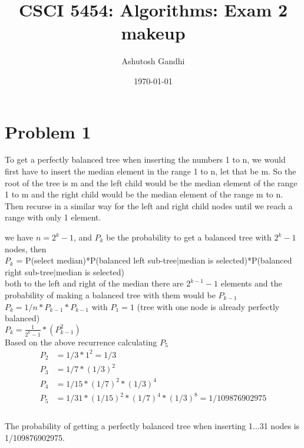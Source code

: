 \documentclass[12pt]{article}
\title{CSCI 5454: Algorithms: Exam 2 makeup}
\author{Ashutosh Gandhi}
\date{\today}
\begin{document}
\maketitle

\section*{Problem 1}


\vspace{10pt}



To get a perfectly balanced tree when inserting the numbers 1 to n, we would first have to insert the median element in the range 1 to n, let that be m. So the root of the tree is m and the left child would be the median element of the range 1 to m and the right child would be the median element of the range m to n. Then recurse in a similar way for the left and right child nodes until we reach a range with only 1 element. 

we have \(n=2^k-1\), and \(P_k\) be the probability to get a balanced tree with \(2^k-1\) nodes, then \\
\(P_k\) = P(select median)*P(balanced left sub-tree\(|\)median is selected)*P(balanced right sub-tree\(|\)median is selected) \\
both to the left and right of the median there are \(2^{k-1}-1\) elements and the probability of making a balanced tree with them would be \(P_{k-1}\) \\
\(P_k = 1/n*P_{k-1}*P_{k-1}\) with \(P_1=1\) (tree with one node is already perfectly balanced) \\
\(P_k=\frac{1}{2^k-1}*(P_{k-1}^2)\) \\
Based on the above recurrence calculating \(P_5\)
\begin{equation}
\begin{aligned}
\nonumber
P_2 &= 1/3*1^2 = 1/3 \\
P_3 &= 1/7*(1/3)^2 \\
P_4 &= 1/15*(1/7)^2*(1/3)^4 \\
P_5 &= 1/31*(1/15)^2*(1/7)^4*(1/3)^8 = 1/109876902975 \\
\end{aligned}
\end{equation}
\\
The probability of getting a perfectly balanced tree when inserting 1...31 nodes is 1/109876902975.
\end{document}
